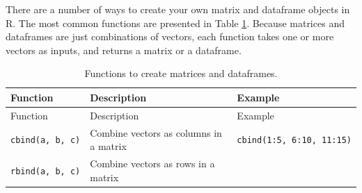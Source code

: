 \documentclass[]{book}
\theoremstyle{definition}
\theoremstyle{definition}
\theoremstyle{remark}
\begin{document}
There are a number of ways to create your own matrix and dataframe
objects in R. The most common functions are presented in Table
\ref{tab:matrixfunctions}. Because matrices and dataframes are just
combinations of vectors, each function takes one or more vectors as
inputs, and returns a matrix or a dataframe.

\begin{longtable}[]{@{}lll@{}}
\caption{\label{tab:matrixfunctions} Functions to create matrices and
dataframes.}\tabularnewline
\toprule
\begin{minipage}[b]{0.19\columnwidth}\raggedright\strut
Function\strut
\end{minipage} & \begin{minipage}[b]{0.27\columnwidth}\raggedright\strut
Description\strut
\end{minipage} & \begin{minipage}[b]{0.41\columnwidth}\raggedright\strut
Example\strut
\end{minipage}\tabularnewline
\midrule
\endfirsthead
\toprule
\begin{minipage}[b]{0.19\columnwidth}\raggedright\strut
Function\strut
\end{minipage} & \begin{minipage}[b]{0.27\columnwidth}\raggedright\strut
Description\strut
\end{minipage} & \begin{minipage}[b]{0.41\columnwidth}\raggedright\strut
Example\strut
\end{minipage}\tabularnewline
\midrule
\endhead
\begin{minipage}[t]{0.19\columnwidth}\raggedright\strut
\texttt{cbind(a,\ b,\ c)}\strut
\end{minipage} & \begin{minipage}[t]{0.27\columnwidth}\raggedright\strut
Combine vectors as columns in a matrix\strut
\end{minipage} & \begin{minipage}[t]{0.41\columnwidth}\raggedright\strut
\texttt{cbind(1:5,\ 6:10,\ 11:15)}\strut
\end{minipage}\tabularnewline
\begin{minipage}[t]{0.19\columnwidth}\raggedright\strut
\texttt{rbind(a,\ b,\ c)}\strut
\end{minipage} & \begin{minipage}[t]{0.27\columnwidth}\raggedright\strut
Combine vectors as rows in a matrix\strut
\end{minipage} & \begin{minipage}[t]{0.41\columnwidth}\raggedright\strut

\end{minipage}
\end{longtable}
\end{document}
